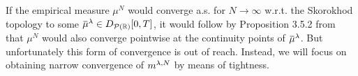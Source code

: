 If the empirical measure \(\mu^N\) would converge a.s. for \( N\to\infty \) w.r.t. the Skorokhod topology to some \( \ol{\mu}^\lambda \in D_{\cP(\potspace)}[0,T] \), it would follow by Proposition 3.5.2 from~\cite{ethierMarkovProcessesCharacterization1986} that \(\mu^N\) would also converge pointwise at the continuity points of \( \ol{\mu}^\lambda \).
But unfortunately this form of convergence is out of reach.  %
Instead, we will focus on obtaining narrow convergence of \(m^{\lambda,N}\) by means of tightness.
